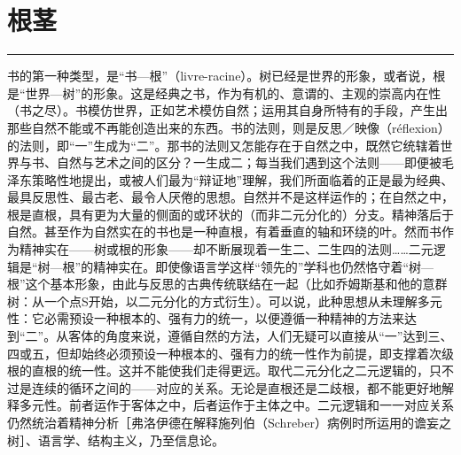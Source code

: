 \documentclass[12pt,a4paper]{article}
\begin{document}
\section{根茎}
\vspace{0.5em}
\vspace{0.3em}

\noindent\rule{\textwidth}{0.4pt}

\vspace{0.3em}



书的第一种类型，是“书—根”（livre-racine）。树已经是世界的形象，或者说，根是“世界—树”的形象。这是经典之书，作为有机的、意谓的、主观的崇高内在性（书之尽）。书模仿世界，正如艺术模仿自然；运用其自身所特有的手段，产生出那些自然不能或不再能创造出来的东西。书的法则，则是反思／映像（réflexion）的法则，即“一”生成为“二”。那书的法则又怎能存在于自然之中，既然它统辖着世界与书、自然与艺术之间的区分？一生成二；每当我们遇到这个法则——即便被毛泽东策略性地提出，或被人们最为“辩证地”理解，我们所面临着的正是最为经典、最具反思性、最古老、最令人厌倦的思想。自然并不是这样运作的；在自然之中，根是直根，具有更为大量的侧面的或环状的（而非二元分化的）分支。精神落后于自然。甚至作为自然实在的书也是一种直根，有着垂直的轴和环绕的叶。然而书作为精神实在——树或根的形象——却不断展现着一生二、二生四的法则……二元逻辑是“树—根”的精神实在。即使像语言学这样“领先的”学科也仍然恪守着“树—根”这个基本形象，由此与反思的古典传统联结在一起（比如乔姆斯基和他的意群树：从一个点S开始，以二元分化的方式衍生）。可以说，此种思想从未理解多元性：它必需预设一种根本的、强有力的统一，以便遵循一种精神的方法来达到“二”。从客体的角度来说，遵循自然的方法，人们无疑可以直接从“一”达到三、四或五，但却始终必须预设一种根本的、强有力的统一性作为前提，即支撑着次级根的直根的统一性。这并不能使我们走得更远。取代二元分化之二元逻辑的，只不过是连续的循环之间的——对应的关系。无论是直根还是二歧根，都不能更好地解释多元性。前者运作于客体之中，后者运作于主体之中。二元逻辑和一一对应关系仍然统治着精神分析［弗洛伊德在解释施列伯（Schreber）病例时所运用的谵妄之树］、语言学、结构主义，乃至信息论。
\end{document}
